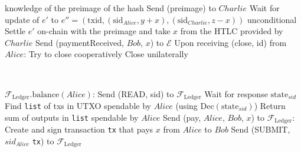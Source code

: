 \begin{algorithmic}[1]
      knowledge of the preimage of the hash
      \State Send (preimage) to $Charlie$
      \State Wait for update of $e'$ to $e'' = \left(\mathrm{txid},
      \left(\mathrm{sid}_{Alice}, y + x\right), \left(\mathrm{sid}_{Charlie}, z -
      x\right)\right)$ unconditional
        \State Settle $e'$ on-chain with the preimage and take $x$ from the HTLC provided
        by $Charlie$
      \EndIf
      \State Send (paymentReceived, $Bob$, $x$) to $\mathcal{E}$
    \State
    \State Upon receiving (close, id) from $Alice$:
        \State Try to close cooperatively 
         
          \State Close unilaterally 
        \EndIf
      \EndIf
  \end{algorithmic}
\hrulefill
\ \\ 
  \label{alg:temp:formalfledger}
  \begin{algorithmic}[1]
    \State $\mathcal{F}_{\mathrm{Ledger}}\mathrm{.balance}\left(Alice\right)$:
    \State
    \State Send (READ, sid) to $\mathcal{F}_{\mathrm{Ledger}}$ 
    \State Wait for response $\mathrm{state}_{sid}$
    \State Find \texttt{list} of txs in UTXO spendable by $Alice$ (using
    $\mathrm{Dec}\left(\mathrm{state}_{sid}\right)$) 
    \State Return sum of outputs in \texttt{list} spendable by $Alice$ 
    \State
    \State
    \State Send (pay, $Alice$, $Bob$, $x$) to $\mathcal{F}_{\mathrm{Ledger}}$:
    \State
    \State Create and sign transaction \texttt{tx} that pays $x$ from $Alice$ to $Bob$
    \State Send (SUBMIT, $sid_{Alice}$ \texttt{tx}) to $\mathcal{F}_{\mathrm{Ledger}}$
  \end{algorithmic}
\hrulefill
